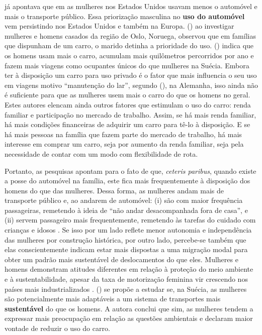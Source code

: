  já apontava que em \citeyear{FOX1983} as mulheres nos Estados Unidos usavam menos o automóvel e mais o transporte público. Essa priorização masculina no \textbf{uso do automóvel} vem persistindo nos Estados Unidos %
e também na Europa.  (\citeyear{HJORTHOL2000}) ao investigar mulheres e homens casados da região de Oslo, Noruega, observou que em famílias que dispunham de um carro, o marido detinha a prioridade do uso.  (\citeyear{POLK2003}) indica que os homens usam mais o carro, acumulam mais quilômetros percorridos por ano e fazem mais viagens como ocupantes únicos do que mulheres na Suécia.
Embora ter à disposição um carro para uso privado é o fator que mais influencia o seu uso em viagens motivo ``manutenção do lar'', segundo  (\citeyear{BEST2005}), na Alemanha, isso ainda não é suficiente para que as mulheres usem mais o carro do que os homens no geral. 
Estes autores elencam ainda outros fatores que estimulam o uso do carro: renda familiar e participação no mercado de trabalho. Assim, se há mais renda familiar, há mais condições financeiras de adquirir um carro para tê-lo à disposição. E se há mais pessoas na família que fazem parte do mercado de trabalho, há mais interesse em comprar um carro, seja por aumento da renda familiar, seja pela necessidade de contar com um modo com flexibilidade de rota.





Portanto, as pesquisas apontam para o fato de que, \emph{ceteris paribus}, quando existe a posse do automóvel na família, este fica mais frequentemente à disposição dos homens do que das mulheres.
Dessa forma, as mulheres andam mais de transporte público e, ao andarem de automóvel: (i) são com maior frequência passageiras, remetendo à ideia de ``não andar desacompanhada fora de casa'', e (ii) servem passageiro mais frequentemente, remetendo às tarefas do cuidado \cite{HIRATA2012} com crianças e idosos \cite{ROSENBLOOM2000,ROSENBLOOM2003}.
Se isso por um lado reflete menor autonomia e independência das mulheres por construção histórica, por outro lado, percebe-se também que elas conscientemente indicam estar mais dispostas a uma migração modal para obter um padrão mais sustentável de deslocamentos do que eles. Mulheres e homens demonstram atitudes diferentes em relação à proteção do meio ambiente e à sustentabilidade, apesar da taxa de motorização feminina vir crescendo nos países mais industrializados \cite{ROOT1999}.  (\citeyear{POLK2003}) se propõe a estudar se, na Suécia, as mulheres são potencialmente mais adaptáveis a um sistema de transportes mais \textbf{sustentável} do que os homens. A autora conclui que sim, as mulheres tendem a expressar mais preocupação em relação as questões ambientais e declaram maior vontade de reduzir o uso do carro. 

